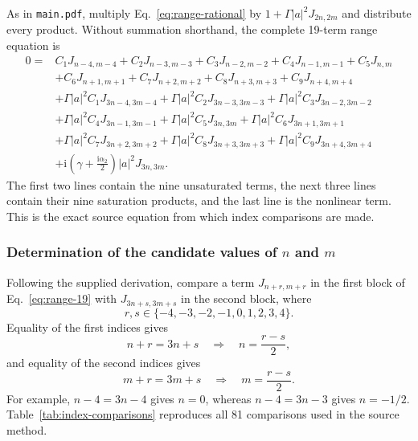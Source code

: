 \documentclass[11pt]{article}
\newcommand{\ii}{\mathrm{i}}
\begin{document}
As in \texttt{main.pdf}, multiply Eq.~\eqref{eq:range-rational} by
$1+\Gamma|a|^2J_{2n,2m}$ and distribute every product.  Without summation
shorthand, the complete 19-term range equation is
\begin{align}
0={}&C_1J_{n-4,m-4}+C_2J_{n-3,m-3}+C_3J_{n-2,m-2}
+C_4J_{n-1,m-1}+C_5J_{n,m}\nonumber\\
&+C_6J_{n+1,m+1}+C_7J_{n+2,m+2}+C_8J_{n+3,m+3}
+C_9J_{n+4,m+4}\nonumber\\
&+\Gamma|a|^2C_1J_{3n-4,3m-4}
+\Gamma|a|^2C_2J_{3n-3,3m-3}
+\Gamma|a|^2C_3J_{3n-2,3m-2}\nonumber\\
&+\Gamma|a|^2C_4J_{3n-1,3m-1}
+\Gamma|a|^2C_5J_{3n,3m}
+\Gamma|a|^2C_6J_{3n+1,3m+1}\nonumber\\
&+\Gamma|a|^2C_7J_{3n+2,3m+2}
+\Gamma|a|^2C_8J_{3n+3,3m+3}
+\Gamma|a|^2C_9J_{3n+4,3m+4}\nonumber\\
&+\ii\left(\gamma+\frac{\ii\alpha_2}{2}\right)|a|^2J_{3n,3m}.
\label{eq:range-19}
\end{align}
The first two lines contain the nine unsaturated terms, the next three lines
contain their nine saturation products, and the last line is the nonlinear
term.  This is the exact source equation from which index comparisons are
made.

\subsubsection{Determination of the candidate values of
\texorpdfstring{$n$ and $m$}{n and m}}

Following the supplied derivation, compare a term $J_{n+r,m+r}$ in the first
block of Eq.~\eqref{eq:range-19} with $J_{3n+s,3m+s}$ in the second block,
where
\begin{equation}
r,s\in\{-4,-3,-2,-1,0,1,2,3,4\}.
\end{equation}
Equality of the first indices gives
\begin{equation}
n+r=3n+s\quad\Longrightarrow\quad n=\frac{r-s}{2},
\label{eq:index-n}
\end{equation}
and equality of the second indices gives
\begin{equation}
m+r=3m+s\quad\Longrightarrow\quad m=\frac{r-s}{2}.
\label{eq:index-m}
\end{equation}
For example, $n-4=3n-4$ gives $n=0$, whereas
$n-4=3n-3$ gives $n=-1/2$.  Table~\ref{tab:index-comparisons} reproduces all
81 comparisons used in the source method.
\end{document}
